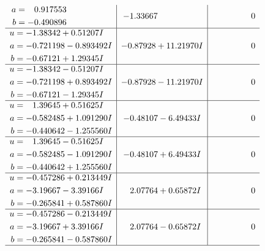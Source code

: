 \documentclass[1p]{elsarticle_modified}
\theoremstyle{definition}
\begin{document}
$$\begin{array}{c|c|c}
\begin{aligned}
a &= \phantom{-}0.917553\phantom{ +0.000000I} \\
b &= -0.490896\phantom{ +0.000000I}\end{aligned}
 & -1.33667\phantom{ +0.000000I} & \phantom{-0.000000 } 0 \\ \hline\begin{aligned}
u &= -1.38342 + 0.51207 I \\
a &= -0.721198 - 0.893492 I \\
b &= -0.67121 + 1.29345 I\end{aligned}
 & -0.87928 + 11.21970 I & \phantom{-0.000000 } 0 \\ \hline\begin{aligned}
u &= -1.38342 - 0.51207 I \\
a &= -0.721198 + 0.893492 I \\
b &= -0.67121 - 1.29345 I\end{aligned}
 & -0.87928 - 11.21970 I & \phantom{-0.000000 } 0 \\ \hline\begin{aligned}
u &= \phantom{-}1.39645 + 0.51625 I \\
a &= -0.582485 + 1.091290 I \\
b &= -0.440642 - 1.255560 I\end{aligned}
 & -0.48107 - 6.49433 I & \phantom{-0.000000 } 0 \\ \hline\begin{aligned}
u &= \phantom{-}1.39645 - 0.51625 I \\
a &= -0.582485 - 1.091290 I \\
b &= -0.440642 + 1.255560 I\end{aligned}
 & -0.48107 + 6.49433 I & \phantom{-0.000000 } 0 \\ \hline\begin{aligned}
u &= -0.457286 + 0.213449 I \\
a &= -3.19667 - 3.39166 I \\
b &= -0.265841 + 0.587860 I\end{aligned}
 & \phantom{-}2.07764 + 0.65872 I & \phantom{-0.000000 } 0 \\ \hline\begin{aligned}
u &= -0.457286 - 0.213449 I \\
a &= -3.19667 + 3.39166 I \\
b &= -0.265841 - 0.587860 I\end{aligned}
 & \phantom{-}2.07764 - 0.65872 I & \phantom{-0.000000 } 0\\
 \hline 
 \end{array}$$\newpage$$\begin{array}{c|c|c}  

\end{array}$$
\end{document}
